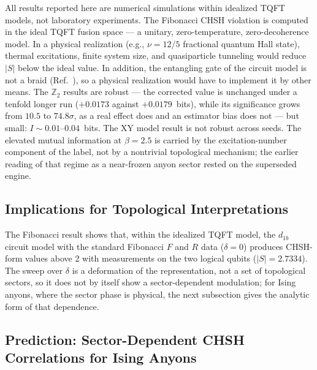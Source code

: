 \documentclass[aps,pra,twocolumn,superscriptaddress,showpacs,floatfix]{revtex4-2}
\newcommand{\Ztwo}{\mathbb{Z}_2}
\begin{document}
All results reported here are numerical simulations within idealized TQFT
models, not laboratory experiments.
The Fibonacci CHSH violation is computed in the ideal TQFT fusion space --- a
unitary, zero-temperature, zero-decoherence model. In a physical realization
(e.g., $\nu = 12/5$ fractional quantum Hall state), thermal excitations,
finite system size, and quasiparticle tunneling would reduce $|S|$ below the
ideal value. In addition, the entangling gate of the circuit model is not a
braid (Ref.~\cite{Sayim2026fibonacci}), so a physical realization would have
to implement it by other means.
The $\Ztwo$ results are robust --- the corrected value is unchanged under a
tenfold longer run ($+0.0173$ against $+0.0179$~bits), while its significance
grows from $10.5$ to $74.8\sigma$, as a real effect does and an estimator bias
does not --- but small: $I \sim 0.01$--$0.04$~bits. The XY model result is not robust across seeds. The elevated mutual
information at $\beta = 2.5$ is carried by the excitation-number component of
the label, not by a nontrivial topological mechanism; the earlier reading of
that regime as a near-frozen anyon sector rested on the superseded engine.

\subsection{Implications for Topological Interpretations}

The Fibonacci result shows that, within the idealized TQFT model, the $d_{1b}$
circuit model with the standard Fibonacci $F$ and $R$ data ($\delta = 0$)
produces CHSH-form values above 2 with measurements on the two logical qubits
($|S| = 2.7334$). The sweep over $\delta$ is a deformation of the
representation, not a set of topological sectors, so it does not by itself
show a sector-dependent modulation; for Ising anyons, where the sector phase
is physical, the next subsection gives the analytic form of that dependence.

\subsection{Prediction: Sector-Dependent CHSH Correlations for Ising Anyons}
\label{sec:ising_prediction}
\end{document}

